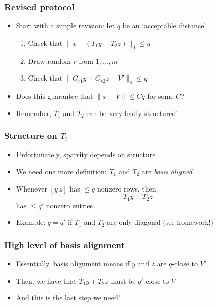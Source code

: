 \documentclass{beamer}
\begin{document}
    \begin{frame}
        \frametitle{Revised protocol}
        \begin{itemize}\itemsep=12pt
            \item Start with a simple revision: let $q$ be an `acceptable distance'
            \begin{enumerate}\itemsep=8pt
                \item Check that $\|x - (T_1y + T_2z)\|_0 \le q$
                \item Draw random $r$ from $1, \dots, m$
                \item Check that $\|G_{r1}y + G_{r2}z - V'\|_0 \le q$
            \end{enumerate}
            \item Does this guarantee that $\|x - V\| \le Cq$ for some $C$?
            \pause
            \item Remember, $T_1$ and $T_2$ can be very badly structured!
        \end{itemize}
	\end{frame}

    \begin{frame}
        \frametitle{Structure on $T_i$}
        \begin{itemize}\itemsep=12pt
            \item Unfortunately, sparsity depends on structure
            \pause
            \item We need one more definition: $T_1$ and $T_2$ are \emph{basis aligned}
            \item Whenever $[y~z]$ has $\le q$ nonzero rows, then
            \[
                T_1y + T_2z
            \]
            has $\le q'$ nonzero entries
            \pause
            \item Example: $q = q'$ if $T_1$ and $T_2$ are only diagonal (see homework!)
        \end{itemize}
	\end{frame}

    \begin{frame}
        \frametitle{High level of basis alignment}
        \begin{itemize}\itemsep=12pt
            \item Essentially, basis alignment means if $y$ and $z$ are $q$-close to $V'$
            \item Then, we have that $T_1y + T_2z$ must be $q'$-close to $V$
            \item And this is the last step we need!
        \end{itemize}
	\end{frame}
\end{document}
